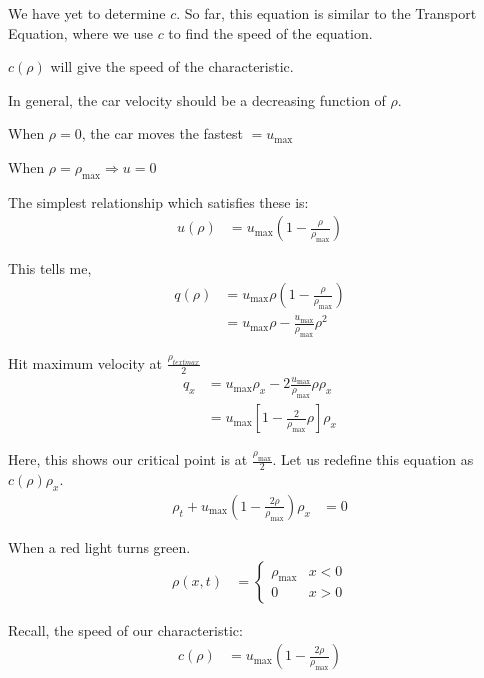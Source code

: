 \documentclass{article}
\begin{document}
We have yet to determine $c$. So far, this equation is similar to the Transport Equation, where we use $c$ to find the speed of the equation.

$c(\rho)$ will give the speed of the characteristic.

In general, the car velocity should be a decreasing function of $\rho$.

When $\rho = 0$, the car moves the fastest $= u_{\text{max}}$

When $\rho = \rho_{\text{max}} \Rightarrow u = 0$

The simplest relationship which satisfies these is:
%
\begin{align}
  u(\rho) & = u_{\text{max}}\left(1 - \frac{\rho}{\rho_{\text{max}}}\right)
\end{align}

This tells me,
%
\begin{align}
  q(\rho)
  & = u_{\text{max}} \rho\left( 1 - \frac{\rho}{\rho_{\text{max}}}\right)\\
  & = u_{\text{max}} \rho - \frac{u_{\text{max}}}{\rho_{\text{max}}} \rho^2
\end{align}

Hit maximum velocity at $\frac{\rho_{text{max}}}{2}$
%
\begin{align}
  q_x
  & = u_{\text{max}} \rho_x - 2 \frac{u_{\max}}{\rho_{\max}} \rho \rho_x\\
  & = u_{\max} \left[ 1 - \frac{2}{\rho_{\max}} \rho \right] \rho_x
\end{align}

Here, this shows our critical point is at $\frac{\rho_{\max}}{2}$. Let us redefine this equation as $c(\rho) \rho_x$.
%
\begin{align}
  \rho_t + u_{\max} \left( 1 - \frac{2\rho}{\rho_{\max}}\right) \rho_x & = 0
\end{align}

\ex When a red light turns green.
%
\begin{align}
  \rho(x, t) & =
  \begin{cases}
    \rho_{\max} & x < 0\\
    0 & x > 0
  \end{cases}
\end{align}

Recall, the speed of our characteristic:
%
\begin{align}
  c(\rho) & = u_{\max} \left(1 - \frac{2 \rho}{\rho_{\max}}\right)
\end{align}
\end{document}
